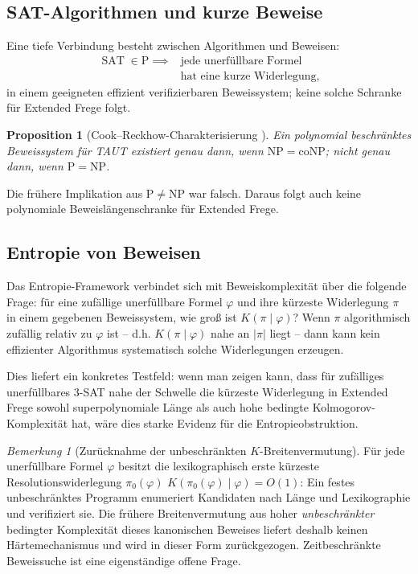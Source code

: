 \documentclass[aps,prd,twocolumn,superscriptaddress,nofootinbib]{revtex4-2}
\newtheorem{proposition}[theorem]{Proposition}
\theoremstyle{definition}
\theoremstyle{remark}
\newtheorem{remark}[theorem]{Bemerkung}
\DeclareMathOperator{\SAT}{SAT}
\newcommand{\NP}{\mathrm{NP}}
\newcommand{\PP}{\mathrm{P}}
\newcommand{\coNP}{\mathrm{coNP}}
\begin{document}
\subsection{SAT-Algorithmen und kurze Beweise}

Eine tiefe Verbindung besteht zwischen Algorithmen und Beweisen:
\begin{equation}
\begin{aligned}
\SAT \in \PP
\implies{}& \text{jede unerfüllbare Formel}\\
& \text{hat eine kurze Widerlegung,}
\end{aligned}
\end{equation}
in einem geeigneten effizient verifizierbaren Beweissystem; keine solche Schranke für Extended Frege folgt.

\begin{proposition}[Cook--Reckhow-Charakterisierung {\cite{CookReckhow1979}}]
\label{prop:proof_complexity}
Ein polynomial beschränktes Beweissystem für TAUT existiert genau
dann, wenn $\NP=\coNP$; nicht genau dann, wenn $\PP=\NP$.
\end{proposition}
Die frühere Implikation aus $\PP\ne\NP$ war falsch. Daraus
folgt auch keine polynomiale Beweislängenschranke für Extended Frege.

\subsection{Entropie von Beweisen}

Das Entropie-Framework verbindet sich mit Beweiskomplexität über die folgende Frage: für eine zufällige unerfüllbare Formel $\varphi$ und ihre kürzeste Widerlegung $\pi$ in einem gegebenen Beweissystem, wie groß ist $K(\pi \mid \varphi)$? Wenn $\pi$ \glqq algorithmisch zufällig\grqq{} relativ zu $\varphi$ ist -- d.h. $K(\pi \mid \varphi)$ nahe an $|\pi|$ liegt -- dann kann kein effizienter Algorithmus systematisch solche Widerlegungen erzeugen.

Dies liefert ein konkretes Testfeld: wenn man zeigen kann, dass für zufälliges unerfüllbares $3$-SAT nahe der Schwelle die kürzeste Widerlegung in Extended Frege sowohl superpolynomiale Länge als auch hohe bedingte Kolmogorov-Komplexität hat, wäre dies starke Evidenz für die Entropieobstruktion.

\begin{remark}[Zurücknahme der unbeschränkten $K$-Breitenvermutung]
\label{conj:resolution-width}
Für jede unerfüllbare Formel $\varphi$ besitzt die lexikographisch erste
kürzeste Resolutionswiderlegung $\pi_0(\varphi)$
$K(\pi_0(\varphi)\mid\varphi)=O(1)$: Ein festes unbeschränktes Programm
enumeriert Kandidaten nach Länge und Lexikographie und verifiziert sie.
Die frühere Breitenvermutung aus hoher \emph{unbeschränkter} bedingter
Komplexität dieses kanonischen Beweises liefert deshalb keinen
Härtemechanismus und wird in dieser Form zurückgezogen.
Zeitbeschränkte Beweissuche ist eine eigenständige offene Frage.
\end{remark}
\end{document}

